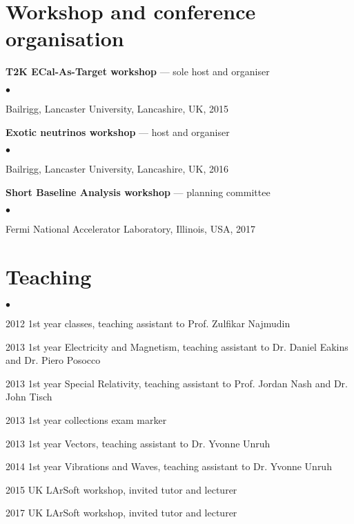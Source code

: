 \documentclass[margin,line]{res}
\newenvironment{list2}{
  \begin{list}{$\bullet$}{%
      \setlength{\itemsep}{0in}
      \setlength{\parsep}{0in} \setlength{\parskip}{0in}
      \setlength{\topsep}{0in} \setlength{\partopsep}{0in} 
      \setlength{\leftmargin}{0.2in}}}{\end{list}}
\begin{document}
\begin{resume}
\section{\sc Workshop and conference organisation}
{\bf T2K ECal-As-Target workshop} --- sole host and organiser
\begin{list2}
\item Bailrigg, Lancaster University, Lancashire, UK, 2015
\end{list2}
{\bf Exotic neutrinos workshop} --- host and organiser
\begin{list2}
\item Bailrigg, Lancaster University, Lancashire, UK, 2016
\end{list2}
{\bf Short Baseline Analysis workshop} --- planning committee
\begin{list2}
\item Fermi National Accelerator Laboratory, Illinois, USA, 2017
\end{list2}

\section{\sc Teaching }
\begin{list2}
\item 2012 1st year classes, teaching assistant to Prof. Zulfikar Najmudin
\item 2013 1st year Electricity and Magnetism, teaching assistant to Dr. Daniel Eakins and Dr. Piero Posocco
\item 2013 1st year Special Relativity, teaching assistant to Prof. Jordan Nash and Dr. John Tisch
\item 2013 1st year collections exam marker
\item 2013 1st year Vectors, teaching assistant to Dr. Yvonne Unruh
\item 2014 1st year Vibrations and Waves, teaching assistant to Dr. Yvonne Unruh
\item 2015 UK LArSoft workshop, invited tutor and lecturer
\item 2017 UK LArSoft workshop, invited tutor and lecturer
\end{list2}


\end{resume}
\end{document}

